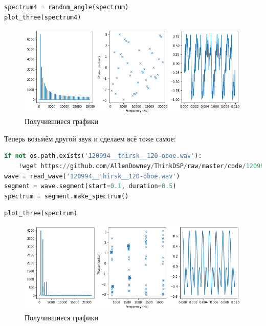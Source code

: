 \begin{lstlisting}[language=Python]
spectrum4 = random_angle(spectrum)
plot_three(spectrum4)
\end{lstlisting}
\begin{figure}[H]
	\begin{center}
		\includegraphics[scale=0.66]{fig/lab06/lab06_54_1.png}
		\caption{Получившиеся графики}
	\end{center}
\end{figure}

Теперь возьмём другой звук и сделаем всё тоже самое:

\begin{lstlisting}[language=Python]
if not os.path.exists('120994__thirsk__120-oboe.wav'):
    !wget https://github.com/AllenDowney/ThinkDSP/raw/master/code/120994__thirsk__120-oboe.wav
wave = read_wave('120994__thirsk__120-oboe.wav')
segment = wave.segment(start=0.1, duration=0.5)
spectrum = segment.make_spectrum()
\end{lstlisting}

\begin{lstlisting}[language=Python]
plot_three(spectrum)
\end{lstlisting}
\begin{figure}[H]
	\begin{center}
		\includegraphics[scale=0.66]{fig/lab06/lab06_58_1.png}
		\caption{Получившиеся графики}
	\end{center}
\end{figure}

